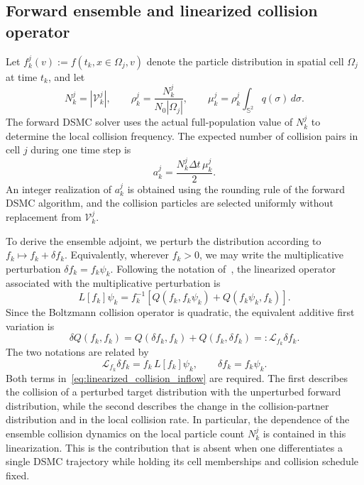 \documentclass[12pt,nopreprintline]{elsarticle}
\begin{document}
\subsection{Forward ensemble and linearized collision operator}

Let $f_k^j(v):=f(t_k,x\in\Omega_j,v)$ denote the particle distribution in spatial cell $\Omega_j$ at time $t_k$, and let
\[
N_k^j=|\mathcal V_k^j|,
\qquad
\rho_k^j=\frac{N_k^j}{N_0|\Omega_j|},
\qquad
\mu_k^j=\rho_k^j\int_{\mathbb S^2}q(\sigma)\,d\sigma.
\]
The forward DSMC solver uses the actual full-population value of $N_k^j$ to determine the local collision frequency. The expected number of collision pairs in cell $j$ during one time step is
\[
a_k^j=\frac{N_k^j\Delta t\,\mu_k^j}{2}.
\]
An integer realization of $a_k^j$ is obtained using the rounding rule of the forward DSMC algorithm, and the collision particles are selected uniformly without replacement from $\mathcal V_k^j$.

To derive the ensemble adjoint, we perturb the distribution according to $f_k\mapsto f_k+\delta f_k$. Equivalently, wherever $f_k>0$, we may write the multiplicative perturbation $\delta f_k=f_k\psi_k$. Following the notation of~\cite{caflisch2021adjoint}, the linearized operator associated with the multiplicative perturbation is
\begin{equation}
L[f_k]\psi_k
=
f_k^{-1}
\left[
Q(f_k,f_k\psi_k)+Q(f_k\psi_k,f_k)
\right].
\label{eq:multiplicative_linearized_collision_inflow}
\end{equation}
Since the Boltzmann collision operator is quadratic, the equivalent additive first variation is
\begin{equation}
\delta Q(f_k,f_k)
=Q(\delta f_k,f_k)+Q(f_k,\delta f_k)
=:\mathcal L_{f_k}\delta f_k.
\label{eq:linearized_collision_inflow}
\end{equation}
The two notations are related by
\[
\mathcal L_{f_k}\delta f_k=f_k\,L[f_k]\psi_k,
\qquad \delta f_k=f_k\psi_k.
\]
Both terms in~\eqref{eq:linearized_collision_inflow} are required. The first describes the collision of a perturbed target distribution with the unperturbed forward distribution, while the second describes the change in the collision-partner distribution and in the local collision rate. In particular, the dependence of the ensemble collision dynamics on the local particle count $N_k^j$ is contained in this linearization. This is the contribution that is absent when one differentiates a single DSMC trajectory while holding its cell memberships and collision schedule fixed.
\end{document}
